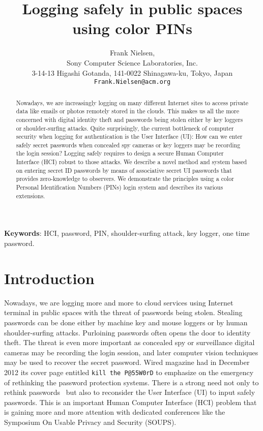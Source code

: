 \documentclass[12pt,onecolumn]{article}
\author{Frank Nielsen,\\
Sony Computer Science Laboratories, Inc.\\
3-14-13 Higashi Gotanda, 141-0022 Shinagawa-ku, Tokyo, Japan\\
{\tt Frank.Nielsen@acm.org}
}
\title{Logging safely in public spaces using color PINs}
\begin{document}
\maketitle


 
\begin{abstract}
Nowadays, we are increasingly logging on many different Internet sites to access private data like emails or photos remotely stored in the clouds.
This makes us all the more concerned with digital identity theft and passwords being stolen either by key loggers or shoulder-surfing attacks.
Quite surprisingly, the current bottleneck of computer security when logging for authentication is the  User Interface (UI): 
How can we enter safely secret passwords when concealed spy cameras or key loggers may be recording the login session?
Logging safely requires to design a secure Human Computer Interface (HCI) robust to those attacks.
We describe a novel method and system based on entering secret ID passwords by means of associative secret UI passwords that provides zero-knowledge
to observers. 
We demonstrate the principles using a color Personal Identification Numbers (PINs) login system and describes its various extensions.
\end{abstract}
 
\parindent 0cm
{\bf Keywords}:
HCI, password, PIN, shoulder-surfing  attack, key logger,  one time password.
 
  
\section{Introduction}


{Nowadays}, we are logging more and more to cloud services using Internet terminal in public spaces with the threat of passwords being stolen.
Stealing passwords can be done either by machine key and mouse loggers or by  human shoulder-surfing  attacks. 
Purloining passwords often opens the door to identity theft.
The threat is even more important as concealed spy or surveillance digital cameras  may be recording the login session, and later computer vision techniques may be used to recover the secret password. 
Wired magazine had in December 2012 its cover page entitled \verb|kill the P@55W0rD|
 to emphasize on the emergency of rethinking the password protection systems.
There is a strong need  not only to rethink passwords~\cite{RethinkingPasswords-2013} but also to reconsider the User Interface (UI) to input safely passwords.
This is an important Human Computer Interface (HCI) problem that is gaining more and more attention with dedicated conferences like
the  Symposium On Usable Privacy and Security (SOUPS). 
\end{document}
